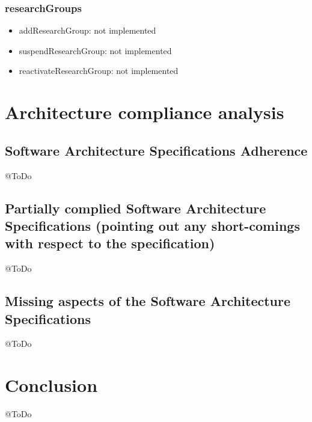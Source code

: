 \documentclass{article}
\begin{document}
		\subsubsection{researchGroups}
			\begin{itemize}
			\item addResearchGroup: not implemented
			\item suspendResearchGroup: not implemented
			\item reactivateResearchGroup: not implemented
			\end{itemize}

   \newpage

\section{Architecture compliance analysis}
     \subsection{Software Architecture Specifications Adherence}

     @ToDo

     \subsection{Partially complied Software Architecture Specifications (pointing out any short-comings with respect to the specification)}

     @ToDo

     \subsection{Missing aspects of the Software Architecture Specifications}

     @ToDo

   	\newpage

\section{Conclusion}

@ToDo
\end{document}
